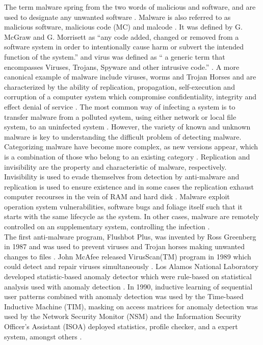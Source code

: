 \documentclass[12pt]{article} %
\begin{document}
The term malware spring from the two words of malicious and software, and are used to designate any unwanted software \cite{Asurveyonmalware}. Malware is also referred to as malicious software, malicious code (MC) and malcode \cite{idika2007survey}. It was defined by G. McGraw and G. Morrisett as “any code added, changed or removed from a software system in order to intentionally cause harm or subvert the intended function of the system.” and virus was defined as “ a generic term that encompasses Viruses, Trojans, Spyware and other intrusive code.” \cite{idika2007survey,Asurveyonmalware}. A more canonical example of malware include viruses, worms and Trojan Horses and are characterized by the ability of replication, propagation, self-execution and corruption of a computer system which compromise confidentiality, integrity and effect denial of service \cite{Asurveyonmalware}. The most common way of infecting a system is to transfer malware from a polluted system, using either network or local file system, to an uninfected system \cite{Asurveyonmalware}. However, the variety of known and unknown malware is key to understanding the difficult problem of detecting malware. Categorizing malware have become more complex, as new versions appear, which is a combination of those who belong to an existing category \cite{idika2007survey}. Replication and invisibility are the property and characteristic of malware, respectively. Invisibility is used to evade themselves from detection by anti-malware and replication is used to ensure existence and in some cases the replication exhaust computer recourses in the vein of RAM and hard disk \cite{Asurveyonmalware}. Malware exploit operation system vulnerabilities, software bugs and foliage itself such that it starts with the same lifecycle as the system. In other cases, malware are remotely controlled on an supplementary system, controlling the infection \cite{Asurveyonmalware}. \\
The first anti-malware program, Flushbot Plus, was invented by Ross Greenberg in 1987 and was used to prevent viruses and Trojan horses making unwanted changes to files \cite{Asurveyonmalware}. John McAfee released VirusScan(TM) program in 1989 which could detect and repair viruses simultaneously \cite{Asurveyonmalware}. Los Alamos National Laboratory developed statistic-based anomaly detector which were rule-based on statistical analysis used with anomaly detection \cite{Asurveyonmalware}. In 1990, inductive learning of sequential user patterns combined with anomaly detection was used by the Time-based Inductive Machine (TIM), masking on access matrices for anomaly detection was used by the Network Security Monitor (NSM) and the Information Security Officer’s Assistant (ISOA) deployed statistics, profile checker, and a expert system, amongst others \cite{Asurveyonmalware}. \\
\end{document}
